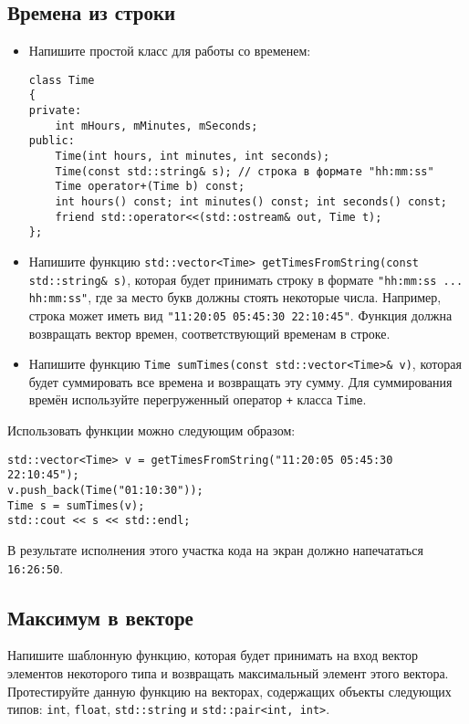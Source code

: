 \documentclass{article}
\begin{document}
\subsection{Времена из строки}
\begin{itemize}
\item Напишите простой класс для работы со временем:
\begin{lstlisting}
class Time 
{
private:
    int mHours, mMinutes, mSeconds;
public:
    Time(int hours, int minutes, int seconds);
    Time(const std::string& s); // строка в формате "hh:mm:ss"
    Time operator+(Time b) const;
    int hours() const; int minutes() const; int seconds() const;
    friend std::operator<<(std::ostream& out, Time t);
};
\end{lstlisting}
\item Напишите функцию \texttt{std::vector<Time> getTimesFromString(const std::string\& s)}, которая будет принимать строку в формате \texttt{"hh:mm:ss ... hh:mm:ss"}, где за место букв должны стоять некоторые числа. Например, строка может иметь вид \texttt{"11:20:05 05:45:30 22:10:45"}. Функция должна возвращать вектор времен, соответствующий временам в строке.
\item Напишите функцию \texttt{Time sumTimes(const std::vector<Time>\& v)}, которая будет суммировать все времена и возвращать эту сумму. Для суммирования времён используйте перегруженный оператор \texttt{+} класса \texttt{Time}.
\end{itemize}
Использовать функции можно следующим образом:
\begin{lstlisting}
std::vector<Time> v = getTimesFromString("11:20:05 05:45:30 22:10:45");
v.push_back(Time("01:10:30"));
Time s = sumTimes(v);
std::cout << s << std::endl;
\end{lstlisting}
В результате исполнения этого участка кода на экран должно напечататься \texttt{16:26:50}.


\subsection{Максимум в векторе}
Напишите шаблонную функцию, которая будет принимать на вход вектор элементов некоторого типа и возвращать максимальный элемент этого вектора.
Протестируйте данную функцию на векторах, содержащих объекты следующих типов: \texttt{int}, \texttt{float}, \texttt{std::string} и \texttt{std::pair<int, int>}.
\end{document}
